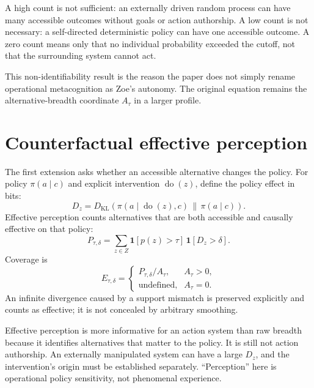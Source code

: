 \documentclass[11pt,a4paper]{article}
\newcommand{\indicator}{\mathbf 1}
\newcommand{\KL}{D_{\mathrm{KL}}}
\newcommand{\doop}{\operatorname{do}}
\begin{document}
A high count is not sufficient: an externally driven random process can have many accessible outcomes without goals or action authorship. A low count is not necessary: a self-directed deterministic policy can have one accessible outcome. A zero count means only that no individual probability exceeded the cutoff, not that the surrounding system cannot act.

This non-identifiability result is the reason the paper does not simply rename operational metacognition as Zoe's autonomy. The original equation remains the alternative-breadth coordinate $A_\tau$ in a larger profile.

\section{Counterfactual effective perception}
The first extension asks whether an accessible alternative changes the policy. For policy $\pi(a\mid c)$ and explicit intervention $\doop(z)$, define the policy effect in bits:
\begin{equation}
D_z=\KL\!\left(\pi(a\mid\doop(z),c)\,\middle\|\,\pi(a\mid c)\right).
\label{eq:policy-effect}
\end{equation}
Effective perception counts alternatives that are both accessible and causally effective on that policy:
\begin{equation}
P_{\tau,\delta}=\sum_{z\in Z}\indicator[p(z)>\tau]\,\indicator[D_z>\delta].
\label{eq:effective-perception}
\end{equation}
Coverage is
\begin{equation}
E_{\tau,\delta}=
\begin{cases}
P_{\tau,\delta}/A_\tau,&A_\tau>0,\\
\text{undefined},&A_\tau=0.
\end{cases}
\end{equation}
An infinite divergence caused by a support mismatch is preserved explicitly and counts as effective; it is not concealed by arbitrary smoothing.

Effective perception is more informative for an action system than raw breadth because it identifies alternatives that matter to the policy. It is still not action authorship. An externally manipulated system can have a large $D_z$, and the intervention's origin must be established separately. ``Perception'' here is operational policy sensitivity, not phenomenal experience.
\end{document}

